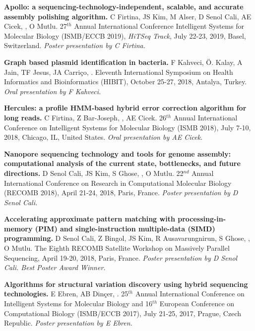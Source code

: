 \vspace{-.2cm}
   {\bf Apollo: a sequencing-technology-independent, scalable, and accurate assembly polishing algorithm.}
  C Firtina, JS Kim, M Alser, D Senol Cali, AE Cicek, \calkan{}, O Mutlu.
27$^{th}$ Annual
International Conference Intelligent Systems for Molecular Biology (ISMB/ECCB 2019), {\em HiTSeq Track},
 July 22-23, 2019, Basel, Switzerland. {\it Poster presentation by C Firtina.}


\vspace{-.2cm}
       {\bf Graph based plasmid identification in bacteria.}
       F Kahveci, Ö. Kalay, A Jain, TF Jesus, JA Carriço, \calkan{}.
       Eleventh International Symposium on Health Informatics and Bioinformatics (HIBIT), October 25-27, 2018, Antalya, Turkey.
       {\it Oral presentation by F Kahveci.}
       
\vspace{-.2cm}
        {\bf Hercules: a profile HMM-based hybrid error correction algorithm for long reads.} C Firtina, Z Bar-Joseph, \calkan{}, AE Cicek. 26$^{th}$ Annual International Conference on Intelligent Systems for Molecular Biology (ISMB 2018), July 7-10, 2018, Chicago, IL, United States.
       {\it Oral presentation by AE Cicek.}

\vspace{-.2cm}
       {\bf Nanopore sequencing technology and tools for genome assembly: computational analysis of the current state, bottlenecks, and future directions.}
       D Senol Cali, JS Kim, S Ghose, \calkan{}, O Mutlu.
       22$^{nd}$ Annual International Conference on Research in Computational Molecular Biology (RECOMB 2018), April 21-24, 2018, Paris, France.
       {\it Poster presentation by D Senol Cali.}

\vspace{-.2cm}
       {\bf Accelerating approximate pattern matching with processing-in-memory (PIM) and single-instruction multiple-data (SIMD) programming.}
       D Senol Cali, Z Bingol, JS Kim, R Ausavarungnirun, S Ghose, \calkan{},
       O Mutlu.
       The Eighth RECOMB Satellite Workshop on Massively Parallel Sequencing, April 19-20, 2018,
       Paris, France.
       {\it Poster presentation by D Senol Cali. Best Poster Award Winner.}

\vspace{-.2cm}
       {\bf Algorithms for structural variation discovery using hybrid sequencing technologies.}
       E Ebren, AB Dinçer, \calkan{}.
       25$^{th}$ Annual International Conference on Intelligent Systems for Molecular Biology and 16$^{th}$ European Conference on 
       Computational Biology  (ISMB/ECCB 2017), 
       July 21-25, 2017, Prague, Czech Republic.
       {\it Poster presentation by E Ebren.}


